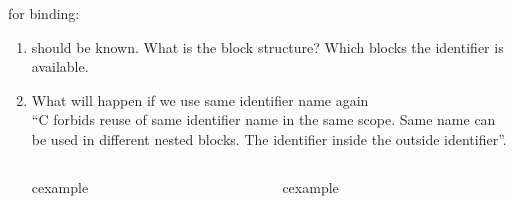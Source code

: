 
\begin{frame}
 for binding:
\begin{enumerate}[<+->]
 \item {} should be known. What is the block
 structure? Which blocks the identifier is available.
 \item  What will happen if we use same identifier name again\\
 ``C forbids reuse of same identifier name in the same scope. Same name can
 be used in different nested blocks. The identifier inside
  the outside identifier''.
\begin{columns}
 \begin{column}{.5\linewidth}
  \begin{beamercolorbox}{cexample}
     \codescopefailC
  \end{beamercolorbox}
 \end{column}
\begin{column}{.5\linewidth}
  \begin{beamercolorbox}{cexample}
 \codescopeokC
\end{beamercolorbox}
\end{column}
\end{columns}
\end{enumerate}
\end{frame}

